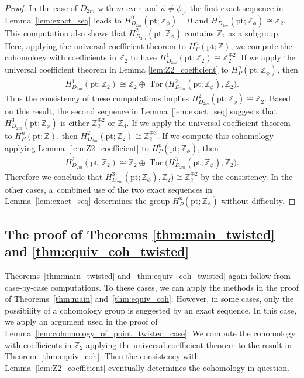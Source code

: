 \documentclass[pdftex]{sigma}
\theoremstyle{definition}
\newcommand{\Z}{\mathbb{Z}}
\newcommand{\pt}{\mathrm{pt}}
\begin{document}
\begin{proof}
In the case of $D_{2m}$ with $m$ even and $\phi \neq \phi_0$, the f\/irst exact sequence in Lemma~\ref{lem:exact_seq} leads to $H^0_{D_{2m}}(\pt; \Z_\phi) = 0$ and $H^1_{D_{2m}}(\pt; \Z_\phi) \cong \Z_2$. This computation also shows that $H^2_{D_{2m}}(\pt; \Z_\phi)$ contains $\Z_2$ as a subgroup. Here, applying the universal coef\/f\/icient theorem to $H^n_P(\pt; \Z)$, we compute the cohomology with coef\/f\/icients in $\Z_2$ to have $H^1_{D_{2m}}(\pt; \Z_2) \cong \Z_2^{\oplus 2}$. If we apply the universal coef\/f\/icient theorem in Lemma \ref{lem:Z2_coefficient} to $H^n_P(\pt; \Z_\phi)$, then
\begin{gather*}
H^1_{D_{2m}}(\pt; \Z_2) \cong \Z_2 \oplus \operatorname{Tor}\big(H^2_{D_{2m}}(\pt; \Z_\phi), \Z_2\big).
\end{gather*}
Thus the consistency of these computations implies $H^2_{D_{2m}}(\pt; \Z_\phi) \cong \Z_2$. Based on this result, the second sequence in Lemma~\ref{lem:exact_seq} suggests that $H^3_{D_{2m}}(\pt; \Z_\phi)$ is either $\Z_2^{\oplus 2}$ or $\Z_4$. If we apply the universal coef\/f\/icient theorem to $H^n_P(\pt; \Z)$, then $H^2_{D_{2m}}(\pt; \Z_2) \cong \Z_2^{\oplus 3}$. If we compute this cohomology applying Lemma~\ref{lem:Z2_coefficient} to $H^n_P(\pt; \Z_\phi)$, then
\begin{gather*}
H^2_{D_{2m}}(\pt; \Z_2) \cong \Z_2 \oplus \operatorname{Tor}\big(H^3_{D_{2m}}(\pt; \Z_\phi), \Z_2\big).
\end{gather*}
Therefore we conclude that $H^3_{D_{2m}}(\pt; \Z_\phi), \Z_2) \cong \Z_2^{\oplus 2}$ by the consistency. In the other cases, a~combined use of the two exact sequences in Lemma~\ref{lem:exact_seq} determines the group $H^n_P(\pt; \Z_\phi)$ without dif\/f\/iculty.
\end{proof}

\subsection{The proof of Theorems \ref{thm:main_twisted} and \ref{thm:equiv_coh_twisted}}

Theorems~\ref{thm:main_twisted} and~\ref{thm:equiv_coh_twisted} again follow from case-by-case computations. To these cases, we can apply the methods in the proof of Theorems~\ref{thm:main} and~\ref{thm:equiv_coh}. However, in some cases, only the possibility of a cohomology group is suggested by an exact sequence. In this case, we apply an argument used in the proof of Lemma~\ref{lem:cohomology_of_point_twisted_case}: We compute the cohomology with coef\/f\/icients in $\Z_2$ applying the universal coef\/f\/icient theorem to the result in Theorem~\ref{thm:equiv_coh}. Then the consistency with Lemma~\ref{lem:Z2_coefficient} eventually determines the cohomology in question.
\end{document}
